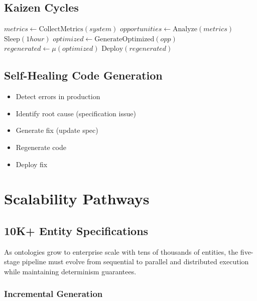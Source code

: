 \subsection{Kaizen Cycles}

\begin{algorithm}
\caption{Kaizen Continuous Improvement}
\begin{algorithmic}[1]
        \State $metrics \gets \text{CollectMetrics}(system)$
        \State $opportunities \gets \text{Analyze}(metrics)$
            \State $\text{Sleep}(1 hour)$
            \State \Continue
        \EndIf
            \State $optimized \gets \text{GenerateOptimized}(opp)$
            \State $regenerated \gets \mu(optimized)$
            \State $\text{Deploy}(regenerated)$
        \EndFor
    \EndWhile
\EndProcedure
\end{algorithmic}
\end{algorithm}

\subsection{Self-Healing Code Generation}

\begin{itemize}
    \item Detect errors in production
    \item Identify root cause (specification issue)
    \item Generate fix (update spec)
    \item Regenerate code
    \item Deploy fix
\end{itemize}

\section{Scalability Pathways}

\subsection{10K+ Entity Specifications}

As ontologies grow to enterprise scale with tens of thousands of entities, the five-stage pipeline must evolve from sequential to parallel and distributed execution while maintaining determinism guarantees.

\subsubsection{Incremental Generation}

